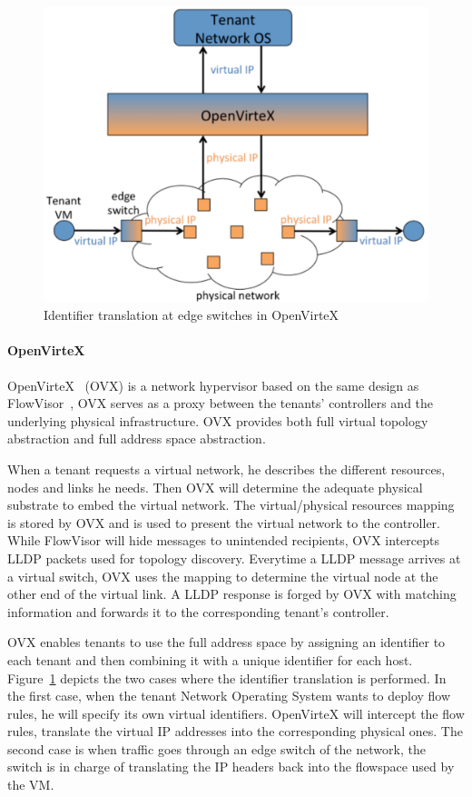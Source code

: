 \begin{figure}[ht]
    \centering
    \includegraphics[scale=0.7]{figures/openvirtex.pdf}
    \caption{Identifier translation at edge switches in OpenVirteX~\cite{OpenVirteX-Al-Shabibi2014}}
    \label{fig:openvirtex}
\end{figure}

\paragraph{OpenVirteX}
OpenVirteX~\cite{OpenVirteX-Al-Shabibi2014} (OVX) is a network hypervisor based on the same design as FlowVisor~\cite{FlowVisor-Sherwood2009}, \ie OVX serves as a proxy between the tenants' controllers and the underlying physical infrastructure. OVX provides both full virtual topology abstraction and full address space abstraction. 

When a tenant requests a virtual network, he describes the different resources, nodes and links he needs.
Then OVX will determine the adequate physical substrate to embed the virtual network.
The virtual/physical resources mapping is stored by OVX and is used to present the virtual network to the controller.
While FlowVisor will hide messages to unintended recipients, OVX intercepts LLDP packets used for topology discovery. Everytime a LLDP message arrives at a virtual switch, OVX uses the mapping to determine the virtual node at the other end of the virtual link. A LLDP response is forged by OVX with matching information and forwards it to the corresponding tenant's controller.

OVX enables tenants to use the full address space by assigning an identifier to each tenant and then combining it with a unique identifier for each host. Figure~\ref{fig:openvirtex} depicts the two cases where the identifier translation is performed. In the first case, when the tenant Network Operating System wants to deploy flow rules, he will specify its own virtual identifiers. OpenVirteX will intercept the flow rules, translate the virtual IP addresses into the corresponding physical ones. The second case is when traffic goes through an edge switch of the network, the switch is in charge of translating the IP headers back into the flowspace used by the VM.

